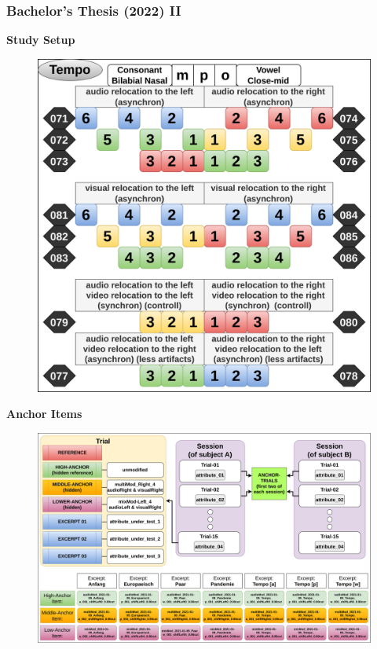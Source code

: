 \documentclass[aspectratio=169]{beamer}
\begin{document}
\begin{frame}[fragile]
	\frametitle{Bachelor's Thesis (2022) II}
    \begin{minipage}{.4\textwidth}
        \centering
        \textbf{Study Setup}
        \begin{figure}
            \centering
            \includegraphics[width=.9\textwidth]{images/DubbingThesisTrials-sessionSingle.png} 
        \end{figure}
    \end{minipage}%
    \begin{minipage}{.6\textwidth}
        \centering
        \textbf{Anchor Items}
        \begin{figure}
            \centering
            \includegraphics[width=1.0\textwidth]{images/DubbingThesisTrials-trialsConcept.png} 
        \end{figure}
    \end{minipage}
\end{frame}
\end{document}
